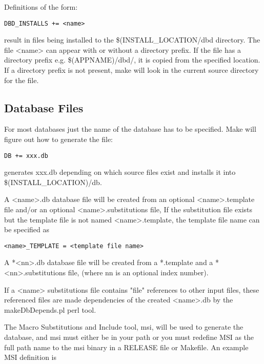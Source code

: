 Definitions of the form:

\begin{verbatim}DBD_INSTALLS += <name>
\end{verbatim}result in files being installed to the \$(INSTALL\_LOCATION/dbd directory. The file \textless{}name\textgreater{} can appear with or without 
a directory prefix. If the file has a directory prefix e.g. \$(APPNAME)/dbd/, it is copied from the specified location. If a 
directory prefix is not present, make will look in the current source directory for the file.

\subsection{Database Files}

For most databases just the name of the database has to be specified. Make will figure out how to generate the file: 

\begin{verbatim}DB += xxx.db
\end{verbatim}generates xxx.db depending on which source files exist and installs it into \$(INSTALL\_LOCATION)/db.

A \textless{}name\textgreater{}.db database file will be created from an optional \textless{}name\textgreater{}.template file and/or an optional 
\textless{}name\textgreater{}.substitutions file, If the substitution file exists but the template file is not named \textless{}name\textgreater{}.template, the template 
file name can be specified as

\begin{verbatim}<name>_TEMPLATE = <template file name>
\end{verbatim}A *\textless{}nn\textgreater{}.db database file will be created from a *.template and a *\textless{}nn\textgreater{}.substitutions file, (where nn is an optional index 
number).

If a \textless{}name\textgreater{} substitutions file contains "file" references to other input files, these referenced files are  made dependencies 
of the created \textless{}name\textgreater{}.db by the makeDbDepends.pl perl tool.

The Macro Substitutions and Include tool, msi, will be used to generate the database, and msi must either be in your path 
or you must redefine MSI as the full path name to the msi binary in a RELEASE file or Makefile. An example MSI 
definition is

